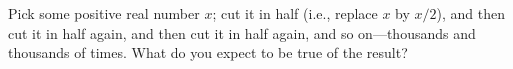 \documentclass{ximera}
\begin{document}
\begin{problem}

  Pick some positive real number $x$; cut it in half (i.e., replace
  $x$ by $x/2$), and then cut it in half again, and then cut it in
  half again, and so on---thousands and thousands of times.  What do
  you expect to be true of the result?
  \begin{multipleChoice}
  \end{multipleChoice}
\end{problem}
\end{document}
